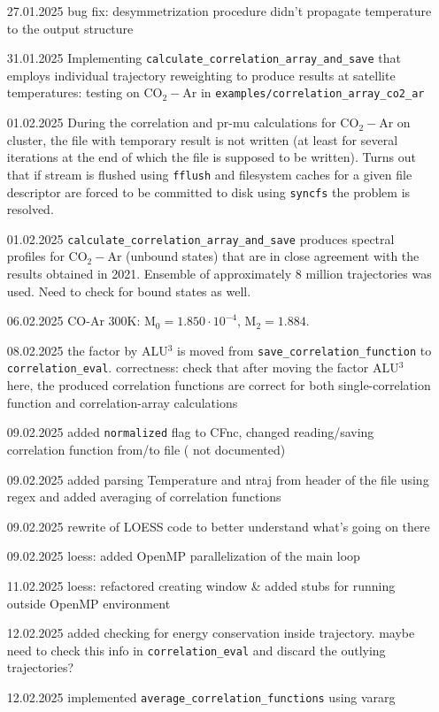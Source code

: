 \documentclass{article}
\begin{document}
\begin{enumerate}
    \item [27.01.2025] bug fix: desymmetrization procedure didn't propagate temperature to the output structure
    \item [31.01.2025] Implementing \texttt{calculate\_correlation\_array\_and\_save} that employs individual trajectory reweighting to produce results at satellite temperatures: testing on CO$_2-$Ar in \texttt{examples/correlation\_array\_co2\_ar}
    \item [01.02.2025] During the correlation and pr-mu calculations for CO$_2-$Ar on cluster, the file with temporary result is not written (at least for several iterations at the end of which the file is supposed to be written). Turns out that if stream is flushed using \texttt{fflush} and filesystem caches for a given file descriptor are forced to be committed to disk using \texttt{syncfs} the problem is resolved.
    \item [01.02.2025] \texttt{calculate\_correlation\_array\_and\_save} produces spectral profiles for CO$_2-$Ar (unbound states) that are in close agreement with the results obtained in 2021. Ensemble of approximately 8 million trajectories was used. {\color{red} Need to check for bound states as well.}
    \item [06.02.2025] CO-Ar 300K: $\text{M}_0 = 1.850 \cdot 10^{-4}$, $\text{M}_2 = 1.884$. 
    \item [08.02.2025] the factor by ALU$^3$ is moved from \texttt{save\_correlation\_function} to \texttt{correlation\_eval}. {\color{red} correctness: check that after moving the factor ALU$^3$ here, the produced correlation functions are correct for both single-correlation function and correlation-array calculations}
    \item [09.02.2025] added \texttt{normalized} flag to CFnc, changed reading/saving correlation function from/to file ({\color{red} not documented})
    \item [09.02.2025] added parsing Temperature and ntraj from header of the file using regex and added averaging of correlation functions
    \item [09.02.2025] rewrite of LOESS code to better understand what's going on there
    \item [09.02.2025] loess: added OpenMP parallelization of the main loop
    \item [11.02.2025] loess: refactored creating window \& added stubs for running outside OpenMP environment
    \item [12.02.2025] added checking for energy conservation inside trajectory. {\color{red} maybe need to check this info in \texttt{correlation\_eval} and discard the outlying trajectories?}
    \item [12.02.2025] implemented \texttt{average\_correlation\_functions} using vararg
\end{enumerate}
\end{document}

